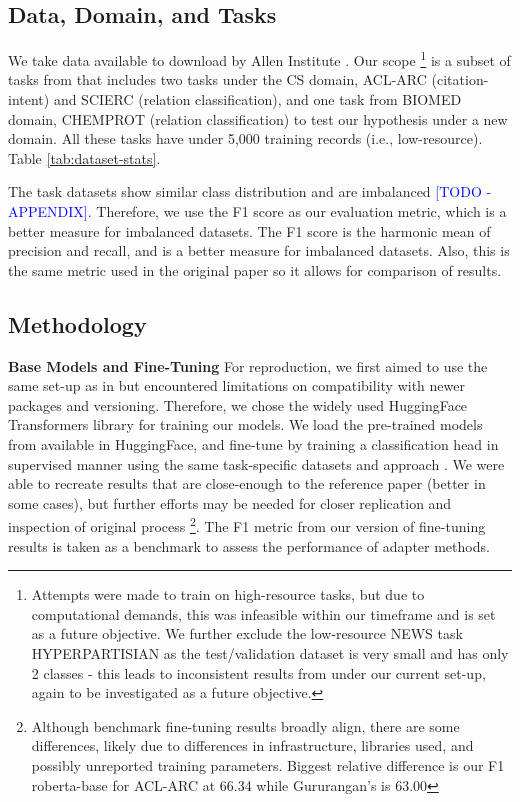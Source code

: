 \documentclass[draft,10pt,twocolumn,letterpaper]{article}
\begin{document}
\subsection{Data, Domain, and Tasks} We take data available to download by Allen Institute \cite{allenai_dont_stop_pretraining}. Our scope \footnote{Attempts were made to train on high-resource tasks, but due to computational demands, this was infeasible within our timeframe and is set as a future objective. We further exclude the low-resource NEWS task HYPERPARTISIAN as the test/validation dataset is very small and has only 2 classes - this leads to inconsistent results from \cite{allenai_dont_stop_pretraining} under our current set-up, again to be investigated as a future objective.} is a subset of tasks from \cite{gururangan2020dont} that includes two tasks under the CS domain, ACL-ARC (citation-intent) and SCIERC (relation classification), and one task from BIOMED domain, CHEMPROT (relation classification) to test our hypothesis under a new domain. All these tasks have under 5,000 training records (i.e., low-resource). Table \ref{tab:dataset-stats}.

The task datasets show similar class distribution and are imbalanced \textcolor{blue}{[TODO - APPENDIX]}. Therefore, we use the F1 score as our evaluation metric, which is a better measure for imbalanced datasets. The F1 score is the harmonic mean of precision and recall, and is a better measure for imbalanced datasets. Also, this is the same metric used in the original paper \cite{gururangan2020dont} so it allows for comparison of results.

\subsection{Methodology} 

\textbf{Base Models and Fine-Tuning} For reproduction, we first aimed to use the same set-up as in \cite{allenai_dont_stop_pretraining} but encountered limitations on compatibility with newer packages and versioning. Therefore, we chose the widely used HuggingFace Transformers library \cite{transformers} for training our models. We load the pre-trained models from \cite{allenai_dont_stop_pretraining} available in HuggingFace, and fine-tune by training a classification head in supervised manner using the same task-specific datasets and approach \cite{gururangan2020dont}. We were able to recreate results that are close-enough to the reference paper (better in some cases), but further efforts may be needed for closer replication and inspection of original process \footnote{Although benchmark fine-tuning results broadly align, there are some differences, likely due to differences in infrastructure, libraries used, and possibly unreported training parameters. Biggest relative difference is our F1 roberta-base for ACL-ARC at 66.34 while Gururangan’s is 63.00}. The F1 metric from our version of fine-tuning results is taken as a benchmark to assess the performance of adapter methods.
\end{document}
